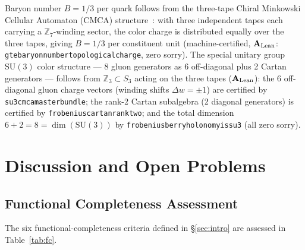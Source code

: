\documentclass[11pt]{article}
\theoremstyle{remark}
\newcommand{\ZS}{\mathbb{Z}_7}
\newcommand{\lean}[1]{%
  \penalty-100
  \begingroup\def\_{\textunderscore\allowbreak}\texttt{#1}\endgroup}
\newcommand{\CatAL}{\ensuremath{\textbf{A}_{\rm Lean}}}
\begin{document}
Baryon number $B = 1/3$ per quark follows from the three-tape Chiral Minkowski Cellular Automaton (CMCA) structure~\cite{SpivackThreeTapeCMCA}:
with three independent tapes each carrying a $\ZS$-winding sector, the color charge is
distributed equally over the three tapes, giving $B = 1/3$ per constituent unit
(machine-certified, $\CatAL$: \lean{gte\_baryon\_number\_topological\_charge}, zero sorry).  The special unitary group $\mathrm{SU}(3)$
color structure --- 8 gluon generators as 6 off-diagonal plus 2 Cartan generators ---
follows from $\mathbb{Z}_3\subset S_3$ acting on the three tapes ($\CatAL$):
the 6 off-diagonal gluon charge vectors (winding shifts $\Delta w = \pm 1$) are
certified by \lean{su3\_cmca\_master\_bundle}; the rank-2 Cartan subalgebra
(2 diagonal generators) is certified by \lean{frobenius\_cartan\_rank\_two};
and the total dimension $6 + 2 = 8 = \dim(\mathrm{SU}(3))$ by
\lean{frobenius\_berry\_holonomy\_is\_su3} (all zero sorry).

\section{Discussion and Open Problems}
\label{sec:discussion}

\subsection{Functional Completeness Assessment}
\label{sec:completeness}

The six functional-completeness criteria defined in \S\ref{sec:intro} are assessed
in Table~\ref{tab:fc}.
\end{document}
